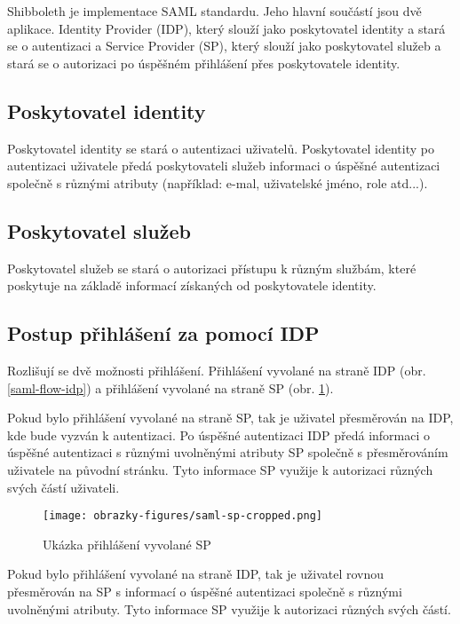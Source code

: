Shibboleth je implementace SAML standardu. Jeho hlavní součástí jsou dvě aplikace. Identity Provider (IDP), který slouží jako poskytovatel identity a stará se o autentizaci a Service Provider (SP), který slouží jako poskytovatel služeb a stará se o autorizaci po úspěšném přihlášení přes poskytovatele identity. \cite{shibbolethWiki}

\subsection{Poskytovatel identity}

Poskytovatel identity se stará o autentizaci uživatelů. Poskytovatel identity po autentizaci uživatele předá poskytovateli služeb informaci o úspěšné autentizaci společně s různými atributy (například: e-mal, uživatelské jméno, role atd...).

\subsection{Poskytovatel služeb}

Poskytovatel služeb se stará o autorizaci přístupu k různým službám, které poskytuje na základě informací získaných od poskytovatele identity.

\subsection{Postup přihlášení za pomocí IDP}\label{IDPlogin}

Rozlišují se dvě možnosti přihlášení. Přihlášení vyvolané na straně IDP (obr. \ref{saml-flow-idp}) a přihlášení vyvolané na straně SP (obr. \ref{saml-flow-sp}).


Pokud bylo přihlášení vyvolané na straně SP, tak je uživatel přesměrován na IDP, kde bude vyzván k autentizaci.
Po úspěšné autentizaci IDP předá informaci o úspěšné autentizaci s různými uvolněnými atributy SP společně s přesměrováním uživatele na původní stránku.
Tyto informace SP využije k autorizaci různých svých částí uživateli.\cite{SAMLxOIDC}
\begin{figure}[bp]
	\centering
    \texttt{[image: obrazky-figures/saml-sp-cropped.png]}
	\caption{Ukázka přihlášení vyvolané SP\cite{SAMLxOIDC}}
	\label{saml-flow-sp}
\end{figure}

Pokud bylo přihlášení vyvolané na straně IDP, tak je uživatel rovnou přesměrován na SP s informací o úspěšné autentizaci společně s různými uvolněnými atributy.
Tyto informace SP využije k autorizaci různých svých částí.\cite{SAMLxOIDC}

